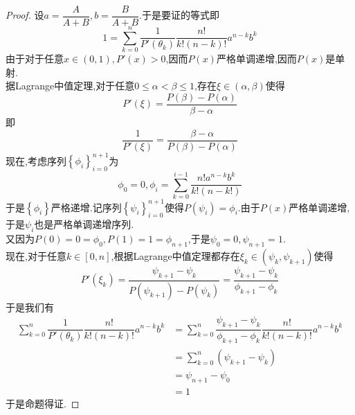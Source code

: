 \documentclass{ctexart}
\begin{document}
\begin{proof}
    设$a=\dfrac{A}{A+B},b=\dfrac{B}{A+B}$.于是要证的等式即
    \[1=\sum_{k=0}^n\dfrac{1}{P'(\theta_k)}\dfrac{n!}{k!(n-k)!}a^{n-k}b^k\]
    由于对于任意$x\in(0,1),P'(x)>0$,因而$P(x)$严格单调递增,因而$P(x)$是单射.\\
    据Lagrange中值定理,对于任意$0\leqslant\alpha<\beta\leqslant1$,存在$\xi\in(\alpha,\beta)$使得
    \[P'(\xi)=\dfrac{P(\beta)-P(\alpha)}{\beta-\alpha}\]
    即\[\dfrac{1}{P'(\xi)}=\dfrac{\beta-\alpha}{P(\beta)-P(\alpha)}\]
    现在,考虑序列$\left\{\phi_i\right\}_{i=0}^{n+1}$为
    \[\phi_{0}=0,\phi_{i}=\sum_{k=0}^{i-1}\dfrac{n!a^{n-k}b^k}{k!(n-k!)}\]
    于是$\left\{\phi_i\right\}$严格递增.记序列$\left\{\psi_i\right\}_{i=0}^{n+1}$使得$P(\psi_i)=\phi_i$.由于$P(x)$严格单调递增,于是$\psi_i$也是严格单调递增序列.\\
    又因为$P(0)=0=\phi_0,P(1)=1=\phi_{n+1}$,于是$\psi_0=0,\psi_{n+1}=1$.\\
    现在,对于任意$k\in[0,n]$,根据Lagrange中值定理都存在$\xi_k\in(\psi_k,\psi_{k+1})$使得
    \[P'(\xi_k)=\dfrac{\psi_{k+1}-\psi_k}{P(\psi_{k+1})-P(\psi_k)}=\dfrac{\psi_{k+1}-\psi_k}{\phi_{k+1}-\phi_k}\]
    于是我们有
    \[\begin{aligned}
        \sum_{k=0}^n\dfrac{1}{P'(\theta_k)}\dfrac{n!}{k!(n-k)!}a^{n-k}b^k
        &= \sum_{k=0}^n\dfrac{\psi_{k+1}-\psi_k}{\phi_{k+1}-\phi_k}\dfrac{n!}{k!(n-k)!}a^{n-k}b^k \\
        &= \sum_{k=0}^n\left(\psi_{k+1}-\psi_k\right) \\
        &= \psi_{n+1}-\psi_0 \\
        &= 1
    \end{aligned}\]
    于是命题得证.
\end{proof}
\end{document}
